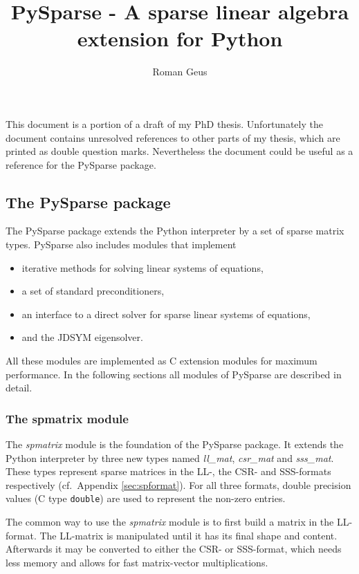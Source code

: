 \documentclass[a4paper]{article}
\title{PySparse - A sparse linear algebra extension for Python}
\author{Roman Geus}
\begin{document}
\maketitle

This document is a portion of a draft of my PhD thesis. Unfortunately
the document contains unresolved references to other parts of my
thesis, which are printed as double question marks. Nevertheless the
document could be useful as a reference for the PySparse package.

\subsection{The PySparse package}
\label{sec:python:pysparse}
%
The PySparse package extends the Python interpreter by a set of sparse
matrix types. PySparse also includes modules that implement
\begin{itemize}
\item iterative methods for solving linear systems of equations,
\item a set of standard preconditioners,
\item an interface to a direct solver for sparse linear systems of
  equations,
\item and the JDSYM eigensolver.
\end{itemize}
%
All these modules are implemented as C extension modules for maximum
performance. In the following sections all modules of PySparse are
described in detail.

\subsubsection{The spmatrix module}
\label{sec:python:spmatrix}
%
The \textit{spmatrix} module is the foundation of the PySparse
package. It extends the Python interpreter by three new types named
\textit{ll\_mat}, \textit{csr\_mat} and \textit{sss\_mat}. These types
represent sparse matrices in the LL-, the CSR- and SSS-formats
respectively (cf.\ Appendix \ref{sec:spformat}). For all three
formats, double precision values (C type \texttt{double}) are used to
represent the non-zero entries.

The common way to use the \textit{spmatrix} module is to first build a
matrix in the LL-format. The LL-matrix is manipulated until it has its
final shape and content. Afterwards it may be converted to either the
CSR- or SSS-format, which needs less memory and allows for fast
matrix-vector multiplications.
\end{document}
